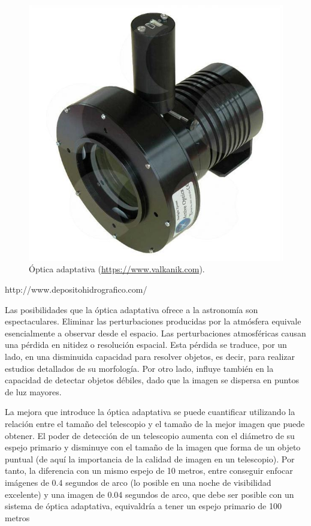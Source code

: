 \bigskip
\begin{figure}[!ht]
  \begin{center}
  \includegraphics[width=1\textwidth]{../images/optica.jpg}
  \caption{Óptica adaptativa (\url{https://www.valkanik.com}).}
  \label{fig:diag_scrum}
  \end{center}
\end{figure}
http://www.depositohidrografico.com/


\bigskip
Las posibilidades que la óptica adaptativa ofrece a la astronomía son espectaculares. Eliminar las perturbaciones producidas por la atmósfera equivale esencialmente a observar desde el espacio. Las perturbaciones atmosféricas causan una pérdida en nitidez o resolución espacial. Esta pérdida se traduce, por un lado, en una disminuida capacidad para resolver objetos, es decir, para realizar estudios detallados de su morfología. Por otro lado, influye también en la capacidad de detectar objetos débiles, dado que la imagen se dispersa en puntos de luz mayores.

\bigskip
La mejora que introduce la óptica adaptativa se puede cuantificar utilizando la relación entre el tamaño del telescopio y el tamaño de la mejor imagen que puede obtener. El poder de detección de un telescopio aumenta con el diámetro de su espejo primario y disminuye con el tamaño de la imagen que forma de un objeto puntual (de aquí la importancia de la calidad de imagen en un telescopio). Por tanto, la diferencia con un mismo espejo de 10 metros, entre conseguir enfocar imágenes de 0.4 segundos de arco (lo posible en una noche de visibilidad excelente) y una imagen de 0.04 segundos de arco, que debe ser posible con un sistema de óptica adaptativa, equivaldría a tener un espejo primario de 100 metros

